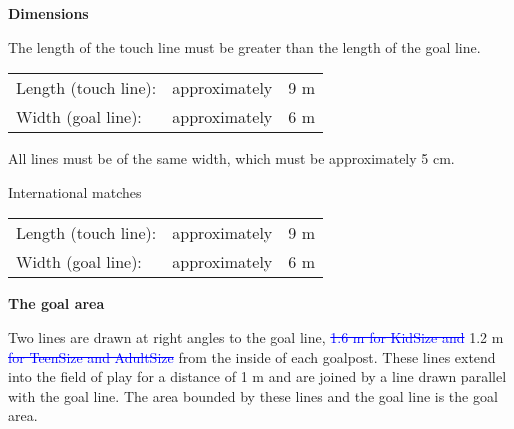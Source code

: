{\textbf{Dimensions}}

\headlinebox

The length of the touch line must be greater than the length of the goal line. 

\bigskip

\begin{tabular}{lll}
Length (touch line): &approximately &9 m \\
Width (goal line): &approximately &6 m
\end{tabular}


\bigskip

All lines must be of the same width, which must be approximately 5 cm. 



\bigskip

International matches 

\begin{tabular}{lll}
Length (touch line): &approximately &9 m \\
Width (goal line): &approximately &6 m
\end{tabular}


\bigskip

{\bfseries The goal area }

\headlinebox

Two lines are drawn at right angles to the goal line, \textcolor{blue}{\sout{1.6 m for KidSize and}} 1.2 m \textcolor{blue}{\sout{for TeenSize and AdultSize}} from the inside of each goalpost. These lines extend into the field of play for a distance of 1 m and are joined by a line drawn parallel with the goal line. The area bounded by these lines and the goal line is the goal area. 

